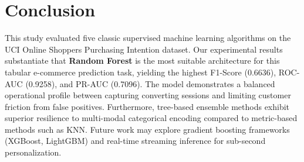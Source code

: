 \documentclass[11pt,a4paper]{article}
\begin{document}
\section{Conclusion}
This study evaluated five classic supervised machine learning algorithms on the UCI Online Shoppers Purchasing Intention dataset. Our experimental results substantiate that \textbf{Random Forest} is the most suitable architecture for this tabular e-commerce prediction task, yielding the highest F1-Score (0.6636), ROC-AUC (0.9258), and PR-AUC (0.7096). The model demonstrates a balanced operational profile between capturing converting sessions and limiting customer friction from false positives. Furthermore, tree-based ensemble methods exhibit superior resilience to multi-modal categorical encoding compared to metric-based methods such as KNN. Future work may explore gradient boosting frameworks (XGBoost, LightGBM) and real-time streaming inference for sub-second personalization.



\end{document}
